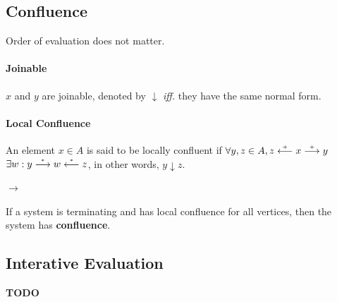 \subsection{Confluence}

Order of evaluation does not matter.

\paragraph{Joinable} $x$ and $y$ are joinable, denoted by $\downarrow$ \emph{iff.} they have the same normal form.

\paragraph{Local Confluence} An element $x \in A$ is said to be locally confluent if $\forall y, z \in A, z \stackrel{\scriptscriptstyle\!+\!}\longleftarrow x \stackrel{\scriptscriptstyle\!+\!}\longrightarrow y$ $\exists w : y \stackrel{\scriptscriptstyle\!*\!}\longrightarrow w \stackrel{\scriptscriptstyle\!*\!}\longleftarrow z$, in other words, $y \downarrow z$.

\paragraph{$\rightarrow$} If a system is terminating and has local confluence for all vertices, then the system has \textbf{confluence}.

\subsection{Interative Evaluation}

\textbf{TODO}
